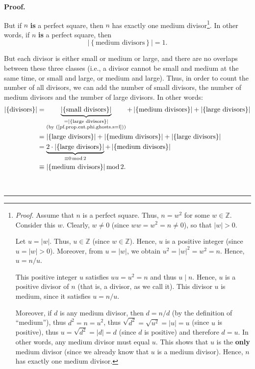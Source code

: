 \documentclass[numbers=enddot,12pt,final,onecolumn,notitlepage]{scrartcl}%
\numberwithin{exer}{subsection}
\theoremstyle{definition}
\newenvironment{fineprint}{\begin{small}}{\end{small}}
\newenvironment{proof}[1][Proof]{\noindent\textbf{#1.} }{\ \rule{0.5em}{0.5em}}
\begin{document}
\begin{proof}
\begin{fineprint}
But if $n$ \textbf{is} a perfect square, then $n$ has exactly one medium
divisor\footnote{\textit{Proof.} Assume that $n$ is a perfect square. Thus,
$n=w^{2}$ for some $w\in\mathbb{Z}$. Consider this $w$. Clearly, $w\neq0$
(since $ww=w^{2}=n\neq0$), so that $\left\vert w\right\vert >0$.
\par
Let $u=\left\vert w\right\vert $. Thus, $u\in\mathbb{Z}$ (since $w\in
\mathbb{Z}$). Hence, $u$ is a positive integer (since $u=\left\vert
w\right\vert >0$). Moreover, from $u=\left\vert w\right\vert $, we obtain
$u^{2}=\left\vert w\right\vert ^{2}=w^{2}=n$. Hence, $u=n/u$.
\par
This positive integer $u$ satisfies $uu=u^{2}=n$ and thus $u\mid n$. Hence,
$u$ is a positive divisor of $n$ (that is, a divisor, as we call it). This
divisor $u$ is medium, since it satisfies $u=n/u$.
\par
Moreover, if $d$ is any medium divisor, then $d=n/d$ (by the definition of
\textquotedblleft medium\textquotedblright), thus $d^{2}=n=u^{2}$, thus
$\sqrt{d^{2}}=\sqrt{u^{2}}=\left\vert u\right\vert =u$ (since $u$ is
positive), thus $u=\sqrt{d^{2}}=\left\vert d\right\vert =d$ (since $d$ is
positive) and therefore $d=u$. In other words, any medium divisor must equal
$u$. This shows that $u$ is the \textbf{only} medium divisor (since we already
know that $u$ is a medium divisor). Hence, $n$ has exactly one medium
divisor.}. In other words, if $n$ \textbf{is} a perfect square, then%
\begin{equation}
\left\vert \left\{  \text{medium divisors}\right\}  \right\vert =1.
\label{pf.prop.ent.phi.ghosts.m1}%
\end{equation}


But each divisor is either small or medium or large, and there are no overlaps
between these three classes (i.e., a divisor cannot be small and medium at the
same time, or small and large, or medium and large). Thus, in order to count
the number of all divisors, we can add the number of small divisors, the
number of medium divisors and the number of large divisors. In other words:%
\begin{align*}
\left\vert \left\{  \text{divisors}\right\}  \right\vert  &
=\underbrace{\left\vert \left\{  \text{small divisors}\right\}  \right\vert
}_{\substack{=\left\vert \left\{  \text{large divisors}\right\}  \right\vert
\\\text{(by (\ref{pf.prop.ent.phi.ghosts.s=l}))}}}+\left\vert \left\{
\text{medium divisors}\right\}  \right\vert +\left\vert \left\{  \text{large
divisors}\right\}  \right\vert \\
&  =\left\vert \left\{  \text{large divisors}\right\}  \right\vert +\left\vert
\left\{  \text{medium divisors}\right\}  \right\vert +\left\vert \left\{
\text{large divisors}\right\}  \right\vert \\
&  =\underbrace{2\cdot\left\vert \left\{  \text{large divisors}\right\}
\right\vert }_{\equiv0\operatorname{mod}2}+\left\vert \left\{  \text{medium
divisors}\right\}  \right\vert \\
&  \equiv\left\vert \left\{  \text{medium divisors}\right\}  \right\vert
\operatorname{mod}2.
\end{align*}



\end{fineprint}
\end{proof}
\end{document}
